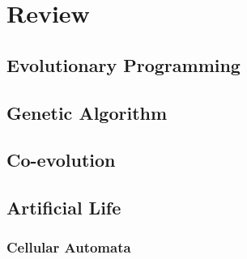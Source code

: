\chapter{Review}

\section{Evolutionary Programming}

\section{Genetic Algorithm}

\section{Co-evolution}

\section{Artificial Life}

\subsection{Cellular Automata}